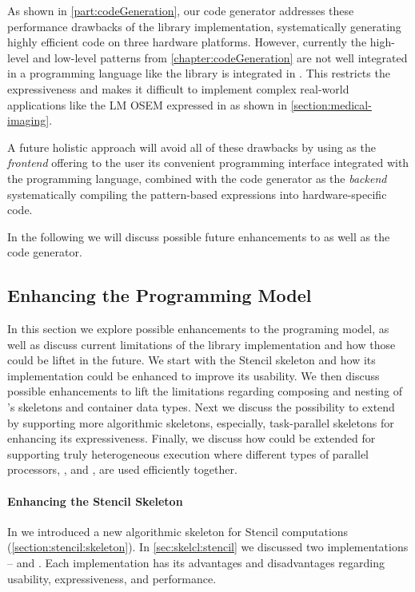 As shown in \autoref{part:codeGeneration}, our code generator addresses these performance drawbacks of the \SkelCL library implementation, systematically generating highly efficient code on three hardware platforms.
However, currently the high-level and low-level patterns from \autoref{chapter:codeGeneration} are not well integrated in a programming language like the \SkelCL library is integrated in \Cpp.
This restricts the expressiveness and makes it difficult to implement complex real-world applications like the LM OSEM expressed in \SkelCL as shown in \autoref{section:medical-imaging}.

A future holistic approach will avoid all of these drawbacks by using \SkelCL as the \emph{frontend} offering to the user its convenient programming interface integrated with the \Cpp programming language, combined with the code generator as the \emph{backend} systematically compiling the pattern-based expressions into hardware-specific code.

\bigskip
In the following we will discuss possible future enhancements to \SkelCL as well as the code generator.

\subsection{Enhancing the \SkelCL Programming Model}
\label{section:future-work:skelcl}

In this section we explore possible enhancements to the \SkelCL programing model, as well as discuss current limitations of the \Cpp library implementation and how those could be liftet in the future.
We start with the Stencil skeleton and how its implementation could be enhanced to improve its usability.
We then discuss possible enhancements to lift the limitations regarding composing and nesting of \SkelCL's skeletons and container data types.
Next we discuss the possibility to extend \SkelCL by supporting more algorithmic skeletons, especially, task-parallel skeletons for enhancing its expressiveness.
Finally, we discuss how \SkelCL could be extended for supporting truly heterogeneous execution where different types of parallel processors, \eg, \CPU and \GPU, are used efficiently together.

\paragraph{Enhancing the Stencil Skeleton}
In \SkelCL we introduced a new algorithmic skeleton for Stencil computations (\autoref{section:stencil:skeleton}).
In \autoref{sec:skelcl:stencil} we discussed two implementations --  and .
Each implementation has its advantages and disadvantages regarding usability, expressiveness, and performance.


